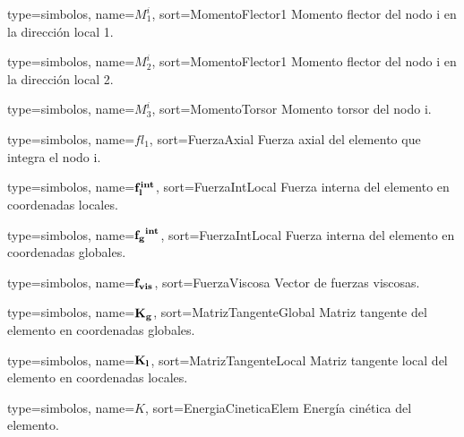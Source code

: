 {
	type={simbolos},
	name={$M^i_1$}, %
	sort={MomentoFlector1} %
}
{Momento flector del nodo i en la dirección local 1.}


{
	type={simbolos},
	name={$M^i_2$}, %
	sort={MomentoFlector1} %
}
{Momento flector del nodo i en la dirección local 2.}

{
	type={simbolos},
	name={$M^i_3$}, %
	sort={MomentoTorsor} %
}
{Momento torsor del nodo i.}


{
	type={simbolos},
	name={$fl_1$}, %
	sort={FuerzaAxial} %
}
{Fuerza axial del elemento que integra el nodo i.}

{
	type={simbolos},
	name={$\bf{ f_l^{int}}$}, %
	sort={FuerzaIntLocal} %
}
{Fuerza interna del elemento en coordenadas locales.}

{
	type={simbolos},
	name={$\bf{f_g}^{int}$}, %
	sort={FuerzaIntLocal} %
}
{Fuerza interna del elemento en coordenadas globales.}

{
	type={simbolos},
	name={$\bf{f_{vis}}$}, %
	sort={FuerzaViscosa} %
}
{Vector de fuerzas viscosas.}

{
	type={simbolos},
	name={$\bf{K_g}$}, %
	sort={MatrizTangenteGlobal} %
}
{Matriz tangente del elemento en coordenadas globales.}

{
	type={simbolos},
	name={$\bf{K_l}$}, %
	sort={MatrizTangenteLocal} %
}
{Matriz tangente local del elemento en coordenadas locales.}

{
	type={simbolos},
	name={$K$}, %
	sort={EnergiaCineticaElem} %
}
{Energía cinética del elemento.}


